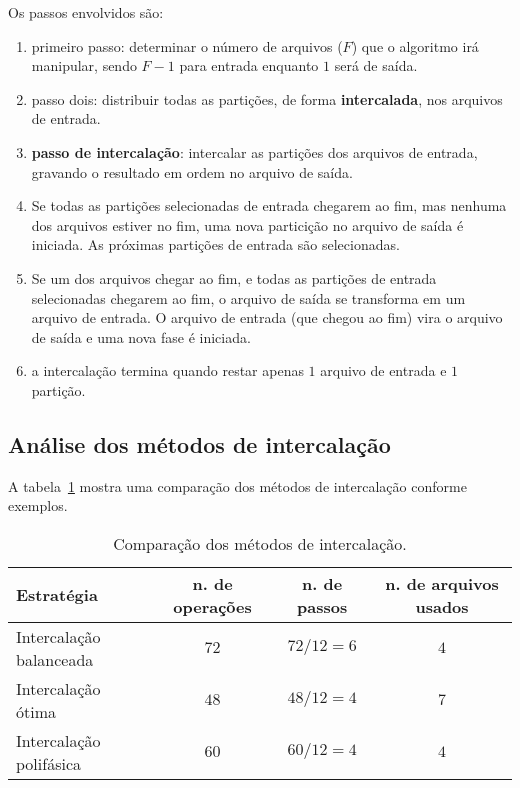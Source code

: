 Os passos envolvidos são:
\begin{enumerate}
\item primeiro passo: determinar o número de arquivos ($F$) que o algoritmo irá
manipular, sendo $F-1$ para entrada enquanto $1$ será de saída.

\item passo dois: distribuir todas as partições, de forma {\bf intercalada},
nos arquivos de entrada.

\item {\bf passo de intercalação}: intercalar as partições dos arquivos de entrada,
gravando o resultado em ordem no arquivo de saída.

\item Se todas as partições selecionadas de entrada chegarem ao fim, 
mas nenhuma dos arquivos estiver no fim, uma nova particição no arquivo
de saída é iniciada.
As próximas partições de entrada são selecionadas.

\item Se um dos arquivos chegar ao fim, e todas as partições de entrada selecionadas
chegarem ao fim, o arquivo de saída se transforma em um arquivo de entrada.
O arquivo de entrada (que chegou ao fim) vira o arquivo de saída e uma nova fase é iniciada.

\item a intercalação termina quando restar apenas $1$ arquivo de entrada e 
$1$ partição.
\end{enumerate}

\subsection{Análise dos métodos de intercalação}

A tabela~\ref{aula04:tab:inter} mostra uma comparação dos métodos de intercalação
conforme exemplos.
%
\begin{table}[!ht]
\centering
\caption{Comparação dos métodos de intercalação.}
\begin{tabular}{l|c|c|c}
\hline
Estratégia & n. de operações & n. de passos & n. de arquivos usados \\ \hline
Intercalação balanceada & $72$ & $72/12 = 6$ & $4$ \\ \hline
Intercalação ótima      & $48$ & $48/12 = 4$ & $7$ \\ \hline
Intercalação polifásica & $60$ & $60/12 = 4$ & $4$ \\ \hline
%
\end{tabular}
\label{aula04:tab:inter}
\end{table}

